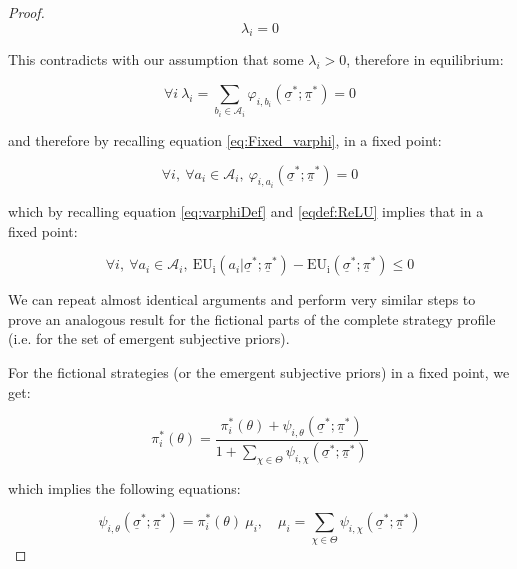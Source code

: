 \documentclass{article}
\theoremstyle{definition}
\begin{document}
\begin{proof}
\begin{equation}
    \lambda_i = 0
\end{equation}

This contradicts with our assumption that some $\lambda_i > 0$, therefore in equilibrium:

\begin{equation}
    \forall i \ \lambda_i = \sum_{b_i \in \mathcal{A}_i} \varphi_{i,b_i}(\underline{\sigma}^*;\underline{\pi}^*) = 0
\end{equation}

and therefore by recalling equation \eqref{eq:Fixed_varphi}, in a fixed point:

\begin{equation}
    \forall i, \ \forall a_i \in \mathcal{A}_i, \ 
    \varphi_{i,a_i}(\underline{\sigma}^*;\underline{\pi}^*) = 0
\end{equation}

which by recalling equation \eqref{eq:varphiDef} and \eqref{eqdef:ReLU} implies that in a fixed point:

\begin{equation}
\label{eq:EU_ineq}
\boxed{
    \forall i, \ \forall a_i \in \mathcal{A}_i, \ 
    \mathrm{EU_i}(a_i|\underline{\sigma}^*;\underline{\pi}^*)
    -
    \mathrm{EU_i}(\underline{\sigma}^*;\underline{\pi}^*)
    \le 0
}
\end{equation}

We can repeat almost identical arguments and perform very similar steps to prove an analogous result for the fictional parts of the complete strategy profile (i.e. for the set of emergent subjective priors).

For the fictional strategies (or the emergent subjective priors) in a fixed point, we get:

\begin{equation}
    \pi^*_i(\theta) = \frac{\pi_i^*(\theta) + \psi_{i,\theta}(\underline{\sigma}^*;\underline{\pi}^*)}{1 + \sum_{\chi \in \Theta} \psi_{i,\chi}(\underline{\sigma}^*;\underline{\pi}^*)} 
\end{equation}

which implies the following equations:

\begin{equation}
\label{eq:Fixed_psi}
    \psi_{i,\theta}(\underline{\sigma}^*;\underline{\pi}^*)
    = \pi_i^*(\theta) \ \mu_i, \quad 
    \mu_i = 
    \sum_{\chi \in \Theta} \psi_{i,\chi}(\underline{\sigma}^*;\underline{\pi}^*)
\end{equation}


\end{proof}
\end{document}
